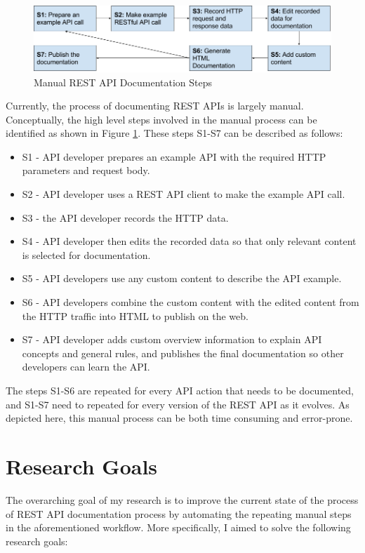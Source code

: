 \begin{figure}[htb]
  \includegraphics[width=\linewidth]{manual_workflow.png}
  \caption{Manual REST API Documentation Steps}
  \label{fig:manual}
\end{figure}

Currently, the process of documenting REST APIs is largely manual. Conceptually, the high level steps involved in the manual process can be identified as shown in Figure \ref{fig:manual}. These steps S1-S7 can be described as follows:

\begin{itemize}
  \item S1 - API developer prepares an example API with the required HTTP parameters and request body.
  \item S2 - API developer uses a REST API client to make the example API call.
  \item S3 - the API developer records the HTTP data.
  \item S4 - API developer then edits the recorded data so that only relevant content is selected for documentation.
  \item S5 - API developers use any custom content to describe the API example.
  \item S6 - API developers combine the custom content with the edited content from the HTTP traffic into HTML to publish on the web.
  \item S7 - API developer adds custom overview information to explain API concepts and general rules, and publishes the final documentation so other developers can learn the API.
\end{itemize}

The steps S1-S6 are repeated for every API action that needs to be documented, and S1-S7 need to repeated for every version of the REST API as it evolves. As depicted here, this manual process can be both time consuming and error-prone.

\section{Research Goals}
The overarching goal of my research is to improve the current state of the process of REST API documentation process by automating the repeating manual steps in the aforementioned workflow. More specifically, I aimed to solve the following research goals:

